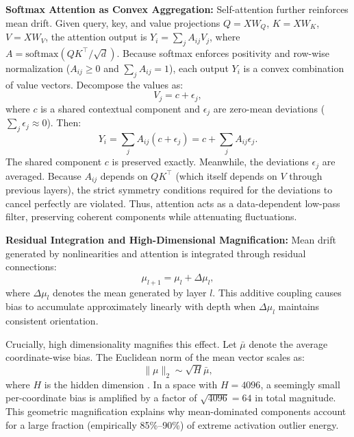 \textbf{Softmax Attention as Convex Aggregation:} Self-attention further reinforces mean drift. Given query, key, and value projections $Q = XW_Q$, $K = XW_K$, $V = XW_V$, the attention output is $Y_i = \sum_j A_{ij} V_j$, where $A = \mathrm{softmax}(QK^\top / \sqrt{d})$. Because softmax enforces positivity and row-wise normalization ($A_{ij} \ge 0$ and $\sum_j A_{ij} = 1$), each output $Y_i$ is a convex combination of value vectors. Decompose the values as:
\begin{equation}
V_j = c + \epsilon_j,
\end{equation}
where $c$ is a shared contextual component and $\epsilon_j$ are zero-mean deviations ($\sum_j \epsilon_j \approx 0$). Then:
\begin{equation}
Y_i = \sum_j A_{ij} (c + \epsilon_j) = c + \sum_j A_{ij} \epsilon_j.
\end{equation}
The shared component $c$ is preserved exactly. Meanwhile, the deviations $\epsilon_j$ are averaged. Because $A_{ij}$ depends on $QK^\top$ (which itself depends on $V$ through previous layers), the strict symmetry conditions required for the deviations to cancel perfectly are violated. Thus, attention acts as a data-dependent low-pass filter, preserving coherent components while attenuating fluctuations.

\textbf{Residual Integration and High-Dimensional Magnification:} Mean drift generated by nonlinearities and attention is integrated through residual connections:
\begin{equation}
\mu_{l+1} = \mu_l + \Delta \mu_l,
\end{equation}
where $\Delta \mu_l$ denotes the mean generated by layer $l$. This additive coupling causes bias to accumulate approximately linearly with depth when $\Delta \mu_l$ maintains consistent orientation.

Crucially, high dimensionality magnifies this effect. Let $\bar{\mu}$ denote the average coordinate-wise bias. The Euclidean norm of the mean vector scales as:
\begin{equation}
\|\mu\|_2 \sim \sqrt{H} \bar{\mu},
\end{equation}
where $H$ is the hidden dimension \citep{tropp2012, halko2011}. In a space with $H=4096$, a seemingly small per-coordinate bias is amplified by a factor of $\sqrt{4096} = 64$ in total magnitude. This geometric magnification explains why mean-dominated components account for a large fraction (empirically 85\%--90\%) of extreme activation outlier energy.

